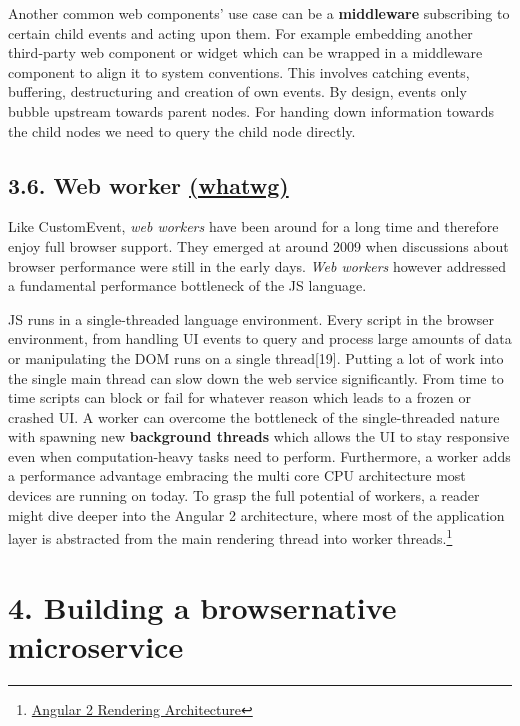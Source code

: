 \documentclass[]{article}
\begin{document}
Another common web components' use case can be a \textbf{middleware}
subscribing to certain child events and acting upon them. For example
embedding another third-party web component or widget which can be
wrapped in a middleware component to align it to system conventions.
This involves catching events, buffering, destructuring and creation of
own events. By design, events only bubble upstream towards parent nodes.
For handing down information towards the child nodes we need to query
the child node directly.

\subsection{\texorpdfstring{3.6. Web worker
\href{https://html.spec.whatwg.org/multipage/workers.html}{(whatwg)}}{3.6. Web worker (whatwg)}}\label{web-worker-whatwg}

Like CustomEvent, \emph{web workers} have been around for a long time
and therefore enjoy full browser support. They emerged at around 2009
when discussions about browser performance were still in the early days.
\emph{Web workers} however addressed a fundamental performance
bottleneck of the JS language.

JS runs in a single-threaded language environment. Every script in the
browser environment, from handling UI events to query and process large
amounts of data or manipulating the DOM runs on a single thread{[}19{]}.
Putting a lot of work into the single main thread can slow down the web
service significantly. From time to time scripts can block or fail for
whatever reason which leads to a frozen or crashed UI. A worker can
overcome the bottleneck of the single-threaded nature with spawning new
\textbf{background threads} which allows the UI to stay responsive even
when computation-heavy tasks need to perform. Furthermore, a worker adds
a performance advantage embracing the multi core CPU architecture most
devices are running on today. To grasp the full potential of workers, a
reader might dive deeper into the Angular 2 architecture, where most of
the application layer is abstracted from the main rendering thread into
worker threads.\footnote{\href{https://docs.google.com/document/d/1M9FmT05Q6qpsjgvH1XvCm840yn2eWEg0PMskSQz7k4E}{Angular
  2 Rendering Architecture}}

\section{4. Building a browsernative
microservice}\label{building-a-browsernative-microservice}
\end{document}
